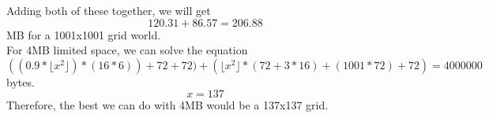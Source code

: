 \documentclass{article}
\begin{document}
Adding both of these together, we will get 
\[120.31 + 86.57 = 206.88\]
MB for a 1001x1001 grid world.\\

For 4MB limited space, we can solve the equation\\
\[ ((0.9 * \lfloor x^2 \rfloor) * (16 * 6)) + 72+72) + (\lfloor x^2 \rfloor * (72 + 3 * 16) + (1001 * 72) + 72) = 4000000\]
 bytes.
\[x = 137\]
Therefore, the best we can do with 4MB would be a 137x137 grid.
\end{document}
